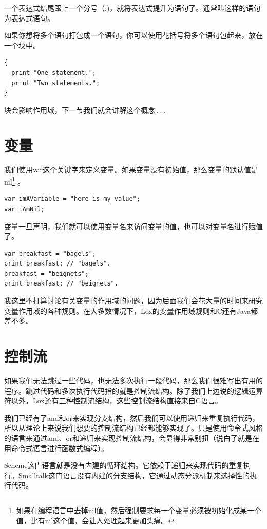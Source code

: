 \documentclass[cn,10pt,math=newtx,citestyle=gb7714-2015,bibstyle=gb7714-2015]{elegantbook}
\begin{document}
一个表达式结尾跟上一个分号（;)，就将表达式提升为语句了。通常叫这样的语句为表达式语句。

如果你想将多个语句打包成一个语句，你可以使用花括号将多个语句包起来，放在一个块中。

\begin{verbatim}
{
  print "One statement.";
  print "Two statements.";
}
\end{verbatim}

块会影响作用域，下一节我们就会讲解这个概念 . . .

\section{变量}

我们使用var这个关键字来定义变量。如果变量没有初始值，那么变量的默认值是nil\footnote{如果在编程语言中去掉nil值，然后强制要求每一个变量必须被初始化成某一个值，比有nil这个值，会让人处理起来更加头痛。} 。

\begin{verbatim}
var imAVariable = "here is my value";
var iAmNil;
\end{verbatim}

变量一旦声明，我们就可以使用变量名来访问变量的值，也可以对变量名进行赋值了。

\begin{verbatim}
var breakfast = "bagels";
print breakfast; // "bagels".
breakfast = "beignets";
print breakfast; // "beignets".
\end{verbatim}

我这里不打算讨论有关变量的作用域的问题，因为后面我们会花大量的时间来研究变量作用域的各种规则。在大多数情况下，Lox的变量作用域规则和C还有Java都差不多。

\section{控制流}

如果我们无法跳过一些代码，也无法多次执行一段代码，那么我们很难写出有用的程序。跳过代码和多次执行代码指的就是控制流结构。除了我们上边说的逻辑运算符以外，Lox还有三种控制流结构，这些控制流结构直接来自C语言。

\begin{tcolorbox}
我们已经有了and和or来实现分支结构，然后我们可以使用递归来重复执行代码，所以从理论上来说我们想要的控制流结构已经都能够实现了。只是使用命令式风格的语言来通过and、or和递归来实现控制流结构，会显得非常别扭（说白了就是在用命令式语言进行函数式编程）。

Scheme这门语言就是没有内建的循环结构。它依赖于递归来实现代码的重复执行。Smalltalk这门语言没有内建的分支结构，它通过动态分派机制来选择性的执行代码。
\end{tcolorbox}
\end{document}
